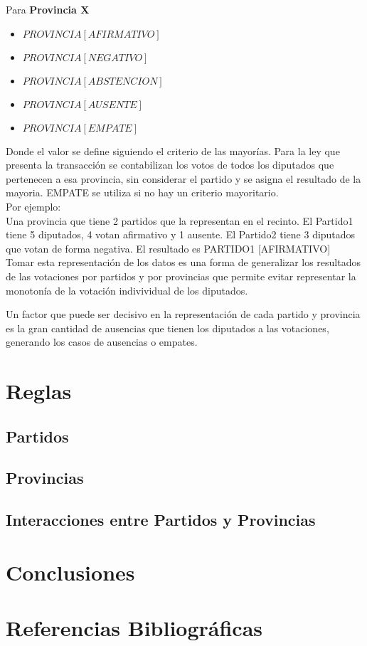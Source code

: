 \documentclass{endm}
\begin{document}
Para \textbf{Provincia X} \\

\begin{itemize}
\item $PROVINCIA [AFIRMATIVO]$
\item $PROVINCIA [NEGATIVO]$
\item $PROVINCIA [ABSTENCION]$
\item $PROVINCIA [AUSENTE]$ 
\item $PROVINCIA [EMPATE]$ \\
\end{itemize}

Donde el valor se define siguiendo el criterio de las mayorías. Para la ley que presenta la transacción se contabilizan los votos de todos los diputados que pertenecen a esa provincia, sin considerar el partido y se asigna el resultado de la mayoria. EMPATE se utiliza si no hay un criterio mayoritario. \\

Por ejemplo: \\

Una provincia que tiene 2 partidos que la representan en el recinto. El Partido1 tiene 5 diputados, 4 votan afirmativo y 1 ausente. El Partido2 tiene 3 diputados que votan de forma negativa. El resultado es PARTIDO1 [AFIRMATIVO] \\

Tomar esta representación de los datos es una forma de generalizar los resultados de las votaciones por partidos y por provincias que permite evitar representar la monotonía de la votación indivividual de los diputados.

Un factor que puede ser decisivo en la representación de cada partido y provincia es la gran cantidad de ausencias que tienen los diputados a las votaciones, generando los casos de ausencias o empates.

\section{Reglas}\label{desarrollo}

\subsection{Partidos}
\subsection{Provincias}
\subsection{Interacciones entre Partidos y Provincias}

\section{Conclusiones}

\section{Referencias Bibliográficas}
\end{document}
